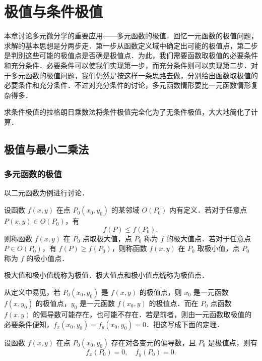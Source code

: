 \chapter{极值与条件极值}

本章讨论多元微分学的重要应用——多元函数的极值．回忆一元函数的极值问题，求解的基本思想是分两步走．第一步从函数定义域中确定出可能的极值点，第二步是判别这些可能的极值点是否确是极值点．为此，我们需要函数取极值的必要条件和充分条件．必要条件可以使我们实现第一步，而充分条件则可以实现第二步．对于多元函数的极值问题，我们仍然是按这样一条思路去做，分别给出函数取极值的必要条件和充分条件．不过对充分条件的讨论，多元函数情形要比一元函数情形复杂得多．

求条件极值的拉格朗日乘数法将条件极值完全化为了无条件极值，大大地简化了计算．

\section{极值与最小二乘法}

\subsection{多元函数的极值}

以二元函数为例进行讨论．

\begin{definition}\label{def:18-1}
设函数 $f(x,y)$ 在点 $P_{0}(x_{0},y_{0})$ 的某邻域 $O(P_{0})$ 内有定义．若对于任意点 $P(x,y)\in O(P_{0})$，有
\begin{equation}
f(P)\leqslant f(P_{0}),
\tag{1}
\end{equation}
则称函数 $f(x,y)$ 在 $P_{0}$ 点取极大值，点 $P_{0}$ 称为 $f$ 的极大值点．若对于任意点 $P\in O(P_{0})$，有 $f(P)\geqslant f(P_{0})$，则称函数 $f(x,y)$ 在 $P_{0}$ 取极小值，点 $P_{0}$ 称为 $f$ 的极小值点．
\end{definition}

极大值和极小值统称为极值．极大值点和极小值点统称为极值点．

从定义中易见，若 $P_{0}(x_{0},y_{0})$ 是 $f(x,y)$ 的极值点，则 $x_{0}$ 是一元函数 $f(x,y_{0})$ 的极值点，$y_{0}$ 是一元函数 $f(x_{0},y)$ 的极值点．而在 $P_{0}$ 点函数 $f(x,y)$ 的偏导数可能存在，也可能不存在．若是前者，则由一元函数取极值的必要条件便知，$f_{x}(x_{0},y_{0})=f_{y}(x_{0},y_{0})=0$．把这写成下面的定理．

\begin{theorem}[取极值的必要条件]\label{thm:18-1}
设函数 $f(x,y)$ 在点 $P_{0}(x_{0},y_{0})$ 存在对各变元的偏导数，且 $P_{0}$ 是极值点，则有
\begin{equation}
f_{x}(P_{0})=0,\quad f_{y}(P_{0})=0.
\tag{2}
\end{equation}
\end{theorem}

